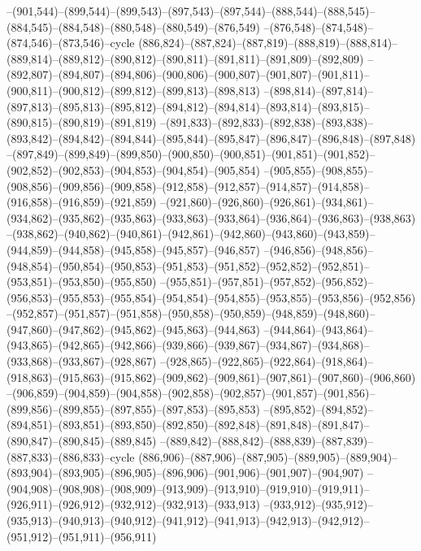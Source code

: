 --(901,544)--(899,544)--(899,543)--(897,543)--(897,544)--(888,544)--(888,545)--(884,545)--(884,548)--(880,548)--(880,549)--(876,549)
--(876,548)--(874,548)--(874,546)--(873,546)--cycle
(886,824)--(887,824)--(887,819)--(888,819)--(888,814)--(889,814)--(889,812)--(890,812)--(890,811)--(891,811)--(891,809)--(892,809)
--(892,807)--(894,807)--(894,806)--(900,806)--(900,807)--(901,807)--(901,811)--(900,811)--(900,812)--(899,812)--(899,813)--(898,813)
--(898,814)--(897,814)--(897,813)--(895,813)--(895,812)--(894,812)--(894,814)--(893,814)--(893,815)--(890,815)--(890,819)--(891,819)
--(891,833)--(892,833)--(892,838)--(893,838)--(893,842)--(894,842)--(894,844)--(895,844)--(895,847)--(896,847)--(896,848)--(897,848)
--(897,849)--(899,849)--(899,850)--(900,850)--(900,851)--(901,851)--(901,852)--(902,852)--(902,853)--(904,853)--(904,854)--(905,854)
--(905,855)--(908,855)--(908,856)--(909,856)--(909,858)--(912,858)--(912,857)--(914,857)--(914,858)--(916,858)--(916,859)--(921,859)
--(921,860)--(926,860)--(926,861)--(934,861)--(934,862)--(935,862)--(935,863)--(933,863)--(933,864)--(936,864)--(936,863)--(938,863)
--(938,862)--(940,862)--(940,861)--(942,861)--(942,860)--(943,860)--(943,859)--(944,859)--(944,858)--(945,858)--(945,857)--(946,857)
--(946,856)--(948,856)--(948,854)--(950,854)--(950,853)--(951,853)--(951,852)--(952,852)--(952,851)--(953,851)--(953,850)--(955,850)
--(955,851)--(957,851)--(957,852)--(956,852)--(956,853)--(955,853)--(955,854)--(954,854)--(954,855)--(953,855)--(953,856)--(952,856)
--(952,857)--(951,857)--(951,858)--(950,858)--(950,859)--(948,859)--(948,860)--(947,860)--(947,862)--(945,862)--(945,863)--(944,863)
--(944,864)--(943,864)--(943,865)--(942,865)--(942,866)--(939,866)--(939,867)--(934,867)--(934,868)--(933,868)--(933,867)--(928,867)
--(928,865)--(922,865)--(922,864)--(918,864)--(918,863)--(915,863)--(915,862)--(909,862)--(909,861)--(907,861)--(907,860)--(906,860)
--(906,859)--(904,859)--(904,858)--(902,858)--(902,857)--(901,857)--(901,856)--(899,856)--(899,855)--(897,855)--(897,853)--(895,853)
--(895,852)--(894,852)--(894,851)--(893,851)--(893,850)--(892,850)--(892,848)--(891,848)--(891,847)--(890,847)--(890,845)--(889,845)
--(889,842)--(888,842)--(888,839)--(887,839)--(887,833)--(886,833)--cycle
(886,906)--(887,906)--(887,905)--(889,905)--(889,904)--(893,904)--(893,905)--(896,905)--(896,906)--(901,906)--(901,907)--(904,907)
--(904,908)--(908,908)--(908,909)--(913,909)--(913,910)--(919,910)--(919,911)--(926,911)--(926,912)--(932,912)--(932,913)--(933,913)
--(933,912)--(935,912)--(935,913)--(940,913)--(940,912)--(941,912)--(941,913)--(942,913)--(942,912)--(951,912)--(951,911)--(956,911)
